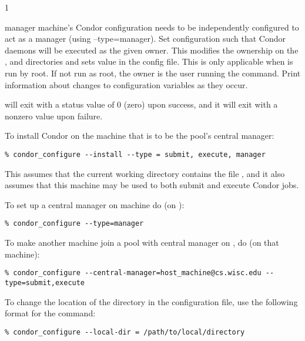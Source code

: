 \begin{ManPage}{\label{man-condor-configure}}{1}
\begin{Options}
{	manager machine's Condor configuration needs to be independently configured to 
	act as a manager (using --type=manager). }
	 {Set configuration
	such that Condor daemons will be executed as the given owner. This modifies the 
	ownership on the ,  and  directories and sets
	 value in the config file.
	This is only applicable when  is run by root.
	If not run as root, the owner is the user running the  
	command.
	}
	 {Print information about changes
	to configuration variables as they occur.}
\end{Options}

\ExitStatus

 will exit with a status value of 0 (zero) upon success,
and it will exit with a nonzero value upon failure.

\Examples
To install Condor on the machine that is to be the pool's central manager:
\begin{verbatim}
% condor_configure --install --type = submit, execute, manager
\end{verbatim}
This assumes that the current working directory contains the
file , and it also assumes that this machine
may be used to both submit and execute Condor jobs.


To set up a central manager on machine  do (on ):
\begin{verbatim}
% condor_configure --type=manager
\end{verbatim}


To make another machine join a pool with central manager on , do (on that machine):
\begin{verbatim}
% condor_configure --central-manager=host_machine@cs.wisc.edu --type=submit,execute
\end{verbatim}


To change the location of the  directory
in the configuration file, use the following format for
the  command:
\begin{verbatim}
% condor_configure --local-dir = /path/to/local/directory
\end{verbatim}



\end{ManPage}
